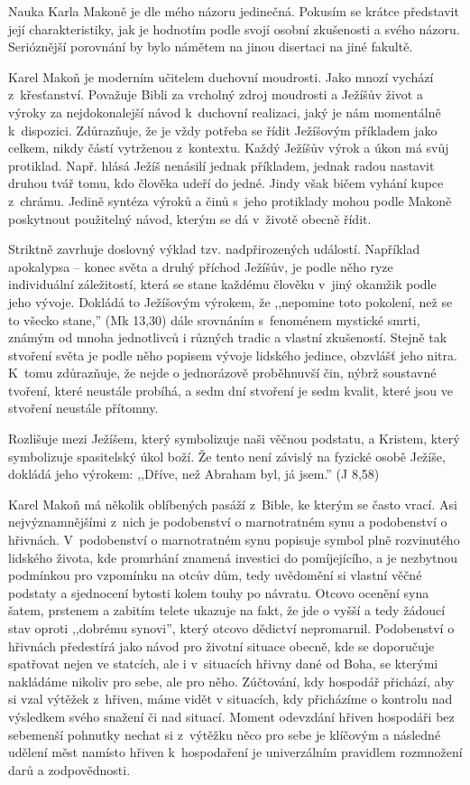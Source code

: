 Nauka Karla Makoně je dle mého názoru jedinečná. Pokusím se krátce představit
její charakteristiky, jak je hodnotím podle svojí osobní zkušenosti a svého
názoru. Serióznější porovnání by bylo námětem na jinou disertaci na jiné
fakultě.

Karel Makoň je moderním učitelem duchovní moudrosti. Jako mnozí vychází z~křesťanství. Považuje Bibli za vrcholný zdroj
moudrosti a Ježíšův život a výroky za nejdokonalejší návod k~duchovní realizaci,
jaký je nám momentálně k~dispozici. Zdůrazňuje, že je vždy potřeba se řídit
Ježíšovým příkladem jako celkem, nikdy částí vytrženou z~kontextu. Každý Ježíšův
výrok a úkon má svůj protiklad. Např. hlásá Ježíš nenásilí jednak příkladem,
jednak radou nastavit druhou tvář tomu, kdo člověka udeří do jedné. Jindy však
bičem vyhání kupce z~chrámu. Jedině syntéza výroků a činů s~jeho protiklady
mohou podle Makoně poskytnout použitelný návod, kterým se dá v~životě obecně
řídit.

Striktně zavrhuje doslovný výklad tzv. nadpřirozených událostí. Například
apokalypsa -- konec světa a druhý příchod Ježíšův, je podle něho ryze individuální záležitostí, která se
stane každému člověku v~jiný okamžik podle jeho vývoje. Dokládá to Ježíšovým
výrokem, že ,,nepomine toto pokolení, než se to všecko stane,'' (Mk 13,30) dále
srovnáním s~fenoménem mystické smrti, známým od mnoha jednotlivců i různých
tradic a vlastní zkušeností. Stejně tak stvoření světa je podle něho popisem
vývoje lidského jedince, obzvlášť jeho nitra. K~tomu zdůrazňuje, že nejde o
jednorázově proběhnuvší čin, nýbrž soustavné tvoření, které neustále probíhá, a
sedm dní stvoření je sedm kvalit, které jsou ve stvoření neustále přítomny.

Rozlišuje mezi Ježíšem, který symbolizuje naši věčnou podstatu, a Kristem, který
symbolizuje spasitelský úkol boží. Že tento není závislý na fyzické osobě Ježíše,
dokládá jeho výrokem: ,,Dříve, než Abraham byl, já jsem.'' (J 8,58)

Karel Makoň má několik oblíbených pasáží z~Bible, ke kterým se často vrací. Asi
nejvýznamnějšími z~nich je podobenství o marnotratném synu a podobenství o
hřivnách. V~podobenství o marnotratném synu popisuje symbol plně rozvinutého
lidského života, kde promrhání znamená investici do pomíjejícího, a je nezbytnou
podmínkou pro vzpomínku na otcův dům, tedy uvědomění si vlastní věčné podstaty a
sjednocení bytosti kolem touhy po návratu. Otcovo ocenění syna šatem, prstenem a
zabitím telete ukazuje na fakt, že jde o vyšší a tedy žádoucí stav oproti
,,dobrému synovi'', který otcovo dědictví nepromarnil. Podobenství o hřivnách
předestírá jako návod pro životní situace obecně, kde se doporučuje spatřovat
nejen ve statcích, ale i v~situacích hřivny dané od Boha, se kterými nakládáme
nikoliv pro sebe, ale pro něho. Zúčtování, kdy hospodář přichází, aby si vzal
výtěžek z~hřiven, máme vidět v situacích, kdy přicházíme o kontrolu nad
výsledkem svého snažení či nad situací. Moment odevzdání hřiven hospodáři bez
sebemenší pohnutky nechat si z~výtěžku něco pro sebe je klíčovým a následné udělení měst
namísto hřiven k~hospodaření je univerzálním pravidlem rozmnožení darů a
zodpovědnosti.

